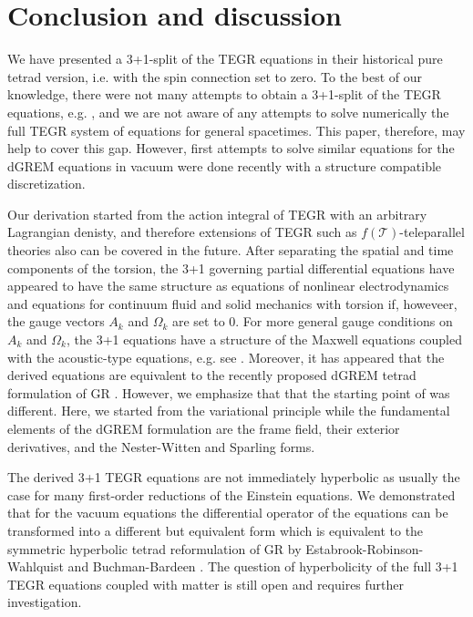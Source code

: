 \documentclass[
10pt, %
a4paper, %
oneside, %
twocolumn,
headinclude,footinclude, %
BCOR5mm, %
]{scrartcl}
\newcommand{\Tscal}{\mathcal{T}}		%
\begin{document}
	
	
	\section{Conclusion and discussion}
	
	We have presented a 3+1-split of the TEGR equations in their historical pure
	tetrad version, i.e. with the spin connection set to zero. To the best of
	our knowledge, there were not many attempts to obtain a 3+1-split of the
	TEGR equations, e.g. \cite{Capozziello2021,Pati2022}, and we are not aware
	of any attempts to solve numerically the full TEGR system of equations for
	general spacetimes. This paper, therefore, may help to cover this gap.
	However, first attempts to solve similar equations for the dGREM equations
	\cite{Olivares2022} in vacuum were done recently \cite{oliynyk2025} with a
	structure compatible discretization.
	
	Our derivation started from the action integral of TEGR with an arbitrary
	Lagrangian denisty, and therefore extensions of TEGR such as $ f(\Tscal)
	$-teleparallel theories also can be covered in the future. After separating
	the spatial and time components of the torsion, the 3+1 governing partial
	differential equations have appeared to have the same structure as equations
	of nonlinear electrodynamics \cite{DPRZ2017} and equations for continuum
	fluid and solid mechanics with torsion \cite{Torsion2019} if, howeveer, the
	gauge vectors $A_k$ and $\Omega_k$ are set to $0$. For more general gauge
	conditions on $A_k$ and $\Omega_k$, the 3+1 equations have a structure of
	the Maxwell equations coupled with the acoustic-type equations, e.g. see
	\cite{MaxwellGLM}. Moreover, it has appeared that the derived equations are
	equivalent to the recently proposed dGREM tetrad formulation of GR
	\cite{Olivares2022}. However, we emphasize that that the starting point of
	\cite{Olivares2022} was different. Here, we started from the variational principle while the fundamental elements of the dGREM
	formulation are the frame field, their exterior derivatives, and the
	Nester-Witten and Sparling forms.
	
	The derived 3+1 TEGR equations are not immediately hyperbolic as usually the
	case for many first-order reductions of the Einstein equations. We
	demonstrated that for the vacuum equations the differential operator of the
	equations can be transformed into a different but equivalent form which is
	equivalent to the symmetric hyperbolic tetrad reformulation of GR by
	Estabrook-Robinson-Wahlquist \cite{Estabrook1997} and Buchman-Bardeen
	\cite{Buchman2003}. The question of hyperbolicity of the full 3+1 TEGR
	equations coupled with matter is still open and requires further
	investigation.
	
\end{document}
